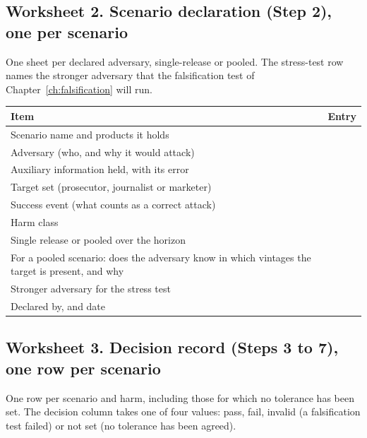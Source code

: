 \subsection*{Worksheet 2. Scenario declaration (Step 2), one per scenario}

One sheet per declared adversary, single-release or pooled. The stress-test row
names the stronger adversary that the falsification test of
Chapter~\ref{ch:falsification} will run.

\begin{center}
\small
\begin{tabular}{@{}>{\raggedright\arraybackslash}p{5.4cm}>{\raggedright\arraybackslash}p{8.8cm}@{}}
\toprule
Item & Entry \\
\midrule
Scenario name and products it holds & \\[8pt]
Adversary (who, and why it would attack) & \\[8pt]
Auxiliary information held, with its error & \\[8pt]
Target set (prosecutor, journalist or marketer) & \\[8pt]
Success event (what counts as a correct attack) & \\[8pt]
Harm class & \\[8pt]
Single release or pooled over the horizon & \\[8pt]
For a pooled scenario: does the adversary know in which vintages the target is
present, and why & \\[8pt]
Stronger adversary for the stress test & \\[8pt]
Declared by, and date & \\[8pt]
\bottomrule
\end{tabular}
\end{center}

\subsection*{Worksheet 3. Decision record (Steps 3 to 7), one row per scenario}

One row per scenario and harm, including those for which no tolerance has been set.
The decision column takes one of four values: pass, fail, invalid (a falsification
test failed) or not set (no tolerance has been agreed).

